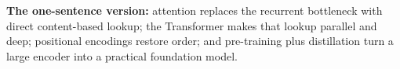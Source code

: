 \begin{InsightBox}
\textbf{The one-sentence version:} attention replaces the recurrent bottleneck with direct content-based lookup; the Transformer makes that lookup parallel and deep; positional encodings restore order; and pre-training plus distillation turn a large encoder into a practical foundation model.
\end{InsightBox}
